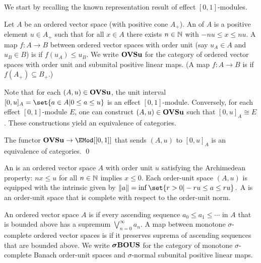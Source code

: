 \documentclass[%
	submission,
copyright,creativecommons,UKenglish]{eptcs}
\begin{document}
We start by recalling the known representation result of
effect $[0,1]$-modules.
\begin{definition}
Let $A$ be an ordered vector space
(with positive cone $A_+$).
An  of $A$
is a positive element $u\in A_{+}$
such that for all $x\in A$
there exists $n\in\mathbb{N}$ with $-n u \le x \le nu$.
A map $f\colon A\to B$ between
ordered vector spaces with order unit
(say $u_A\in A$ and $u_B\in B$)
is  if $f(u_A)\le u_B$.
We write $\mathbf{OVSu}$ for the category of
ordered vector spaces with order unit
and subunital positive linear maps.
(A map $f\colon A\to B$ is  if $f(A_+)\subseteq B_+$.)
\end{definition}

Note that for each $(A,u)\in\mathbf{OVSu}$,
the unit interval $[0,u]_A=\set{a\in A| 0\le a \le u}$
is an effect $[0,1]$-module.
Conversely,
for each effect $[0,1]$-module $E$,
one can construct $(A,u)\in\mathbf{OVSu}$
such that $[0,u]_A\cong E$
\cite{gudder1998representation,JacobsMF2016}.
These constructions yield an equivalence of categories.

\begin{proposition}
\label{prop:OVSu-equiv-EMod}
The functor $\OVSu\to\EMod[[0,1]]$
that sends $(A,u)$ to $[0,u]_A$ is an equivalence of categories.
\qed
\end{proposition}

\begin{definition}
An 
is an ordered vector space
$A$ with order unit $u$
satisfying the Archimedean property:
$nx\le u$ for all $n\in\mathbb{N}$ implies $x\le 0$.
Each order-unit space $(A,u)$
is equipped with the intrinsic
 given by
$
\norm{a}=\inf\set{r>0 | -ru\le a\le ru}
\mpunct.
$
A  is an
order-unit space that is complete with respect to
the order-unit norm.
\end{definition}

\begin{definition}
An ordered vector space $A$ is
if every ascending sequence $a_0\le a_1\le \dotsb$
in $A$ that is bounded above
has a supremum $\bigvee_{n=0}^{\infty} a_n$.
A map between
monotone $\sigma$-complete ordered vector spaces
is 
if it preserves suprema of
ascending sequences that are bounded above.
We write $\boldsymbol{\sigma}\mathbf{BOUS}$ for the category of
monotone $\sigma$-complete Banach order-unit spaces
and $\sigma$-normal subunital positive linear maps.
\end{definition}
\end{document}
